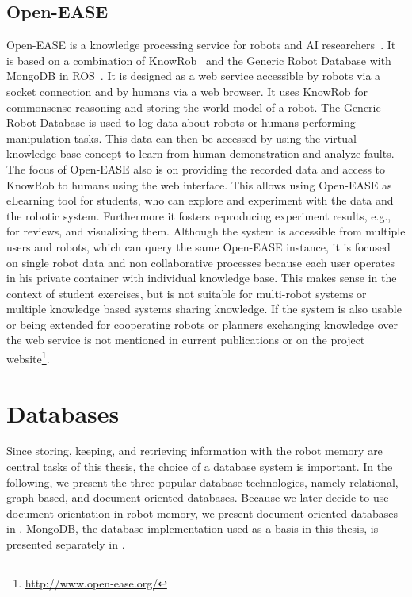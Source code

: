 \subsection{Open-EASE}
\label{sec:openease}
Open-EASE is a knowledge processing service for robots and AI
researchers~\cite{OpenEASE}. It is based on a combination of
KnowRob~\cite{KnowRob} and the Generic Robot Database with MongoDB in
ROS~\cite{RoboDB}. It is designed as a web service accessible by
robots via a socket connection and by humans via a web browser. It
uses KnowRob for commonsense reasoning and storing the world model of
a robot. The Generic Robot Database is used to log data about robots
or humans performing manipulation tasks. This data can then be
accessed by using the virtual knowledge base concept to learn from
human demonstration and analyze faults. The focus of Open-EASE also is
on providing the recorded data and access to KnowRob to humans using
the web interface. This allows using Open-EASE as eLearning tool for
students, who can explore and experiment with the data and the robotic
system. Furthermore it fosters reproducing experiment results, e.g.,
for reviews, and visualizing them. Although the system is
accessible from multiple users and robots, which can query the same
Open-EASE instance, it is focused on single robot data and non
collaborative processes because each user operates in his private
container with individual knowledge base. This makes sense in the
context of student exercises, but is not suitable for multi-robot
systems or multiple knowledge based systems sharing knowledge. If the
system is also usable or being extended for cooperating robots or
planners exchanging knowledge over the web service is not mentioned in
current publications or on the project
website\footnote{\url{http://www.open-ease.org/}}.


\section{Databases}
\label{sec:databases}
Since storing, keeping, and retrieving information with the robot
memory are central tasks of this thesis, the choice of a database
system is important. In the following, we present the three popular
database technologies, namely relational, graph-based, and
document-oriented databases. Because we later decide to use
document-orientation in robot memory, we present document-oriented
databases in . MongoDB, the database
implementation used as a basis in this thesis, is presented separately
in .

